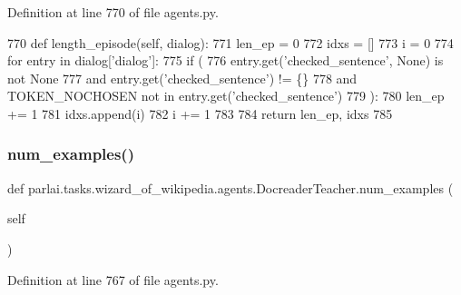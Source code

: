 Definition at line 770 of file agents.\+py.


\begin{DoxyCode}
770     \textcolor{keyword}{def }length\_episode(self, dialog):
771         len\_ep = 0
772         idxs = []
773         i = 0
774         \textcolor{keywordflow}{for} entry \textcolor{keywordflow}{in} dialog[\textcolor{stringliteral}{'dialog'}]:
775             \textcolor{keywordflow}{if} (
776                 entry.get(\textcolor{stringliteral}{'checked\_sentence'}, \textcolor{keywordtype}{None}) \textcolor{keywordflow}{is} \textcolor{keywordflow}{not} \textcolor{keywordtype}{None}
777                 \textcolor{keywordflow}{and} entry.get(\textcolor{stringliteral}{'checked\_sentence'}) != \{\}
778                 \textcolor{keywordflow}{and} TOKEN\_NOCHOSEN \textcolor{keywordflow}{not} \textcolor{keywordflow}{in} entry.get(\textcolor{stringliteral}{'checked\_sentence'})
779             ):
780                 len\_ep += 1
781                 idxs.append(i)
782             i += 1
783 
784         \textcolor{keywordflow}{return} len\_ep, idxs
785 
\end{DoxyCode}
\mbox{\label{classparlai_1_1tasks_1_1wizard__of__wikipedia_1_1agents_1_1DocreaderTeacher_a19d99509fbf9887048b14676d0c54df7}} 
\subsubsection{\texorpdfstring{num\+\_\+examples()}{num\_examples()}}
{\footnotesize\ttfamily def parlai.\+tasks.\+wizard\+\_\+of\+\_\+wikipedia.\+agents.\+Docreader\+Teacher.\+num\+\_\+examples (\begin{DoxyParamCaption}\item[{}]{self }\end{DoxyParamCaption})}



Definition at line 767 of file agents.\+py.


